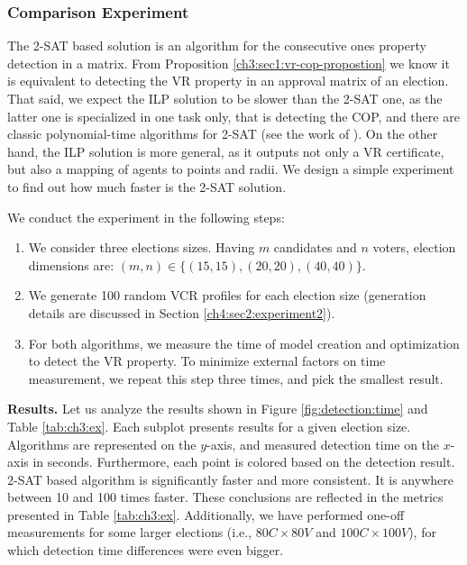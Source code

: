 \subsubsection{Comparison Experiment}
The 2-SAT based solution is an algorithm for the consecutive ones property detection in a matrix.
From Proposition \ref{ch3:sec1:vr-cop-propostion} we know it is equivalent to detecting the VR property in an approval matrix of an election.
That said, we expect the ILP solution to be slower than the 2-SAT one,
as the latter one is specialized in one task only, that is detecting the COP,
and there are classic polynomial-time algorithms for 2-SAT (see the work of \cite{aspvall-poly-2sat}). 
On the other hand, the ILP solution is more general, 
as it outputs not only a VR certificate, but also a mapping of agents to points and radii.
We design a simple experiment to find out how much faster is the 2-SAT solution.

We conduct the experiment in the following steps:
\begin{enumerate}
    \item We consider three elections sizes. Having $m$ candidates and $n$ voters, election dimensions are: $(m,n) \in \{(15,15), (20,20), (40,40)\}$. 

    \item We generate 100 random VCR profiles for each election size (generation details are discussed in Section \ref{ch4:sec2:experiment2}).
    
    \item For both algorithms, we measure the time of model creation and optimization to detect the VR property.
    To minimize external factors on time measurement, we repeat this step three times, and pick the smallest result. 
\end{enumerate}
\noindent \textbf{Results.} \indent Let us analyze the results shown in Figure \ref{fig:detection:time} and Table \ref{tab:ch3:ex}.
Each subplot presents results for a given election size.
Algorithms are represented on the $y$-axis, and measured detection time on the $x$-axis in seconds.
Furthermore, each point is colored based on the detection result. 
2-SAT based algorithm is significantly faster and more consistent. It is anywhere between 10 and 100 times faster.
These conclusions are reflected in the metrics presented in Table \ref{tab:ch3:ex}.
Additionally, we have performed one-off measurements for some larger elections (i.e., $80C \times 80V$ and $100C \times 100V$),
for which detection time differences were even bigger.

